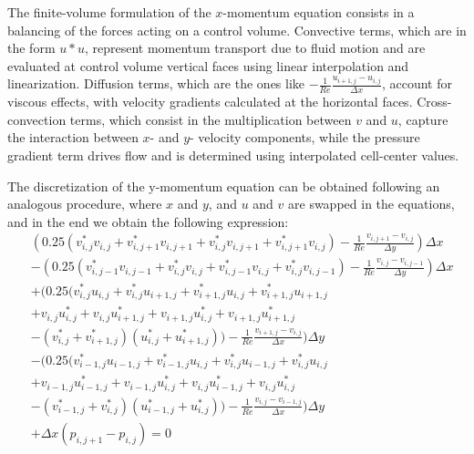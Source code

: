 \documentclass{article}
\begin{document}
The finite-volume formulation of the $x$-momentum equation consists in a balancing of the forces acting on a control volume.
Convective terms, which are in the form $u*u$, represent momentum transport due to fluid motion and are evaluated at control volume vertical faces using linear interpolation and linearization.
Diffusion terms, which are the ones like $-\frac{1}{Re} \frac{u_{i+1,j} - u_{i,j}}{\Delta x}$, account for viscous effects, with velocity gradients calculated at the horizontal faces.
Cross-convection terms, which consist in the multiplication between $v$ and $u$, capture the interaction between $x$- and $y$- velocity components, while the pressure gradient term drives flow and is determined using interpolated cell-center values.

The discretization of the y-momentum equation can be obtained following an analogous procedure, where $x$ and $y$, and $u$ and $v$ are swapped in the equations, and in the end we obtain the following expression:
\begin{equation}
  \begin{aligned}
    & (0.25 (v^*_{i,j} v_{i,j} + v^*_{i,j+1} v_{i,j+1} + v^*_{i,j} v_{i,j+1} + v^*_{i,j+1} v_{i,j}) - \frac{1}{Re} \frac{v_{i,j+1} - v_{i,j}}{\Delta y}) \Delta x  \\
    & - (0.25 (v^*_{i,j-1} v_{i,j-1} + v^*_{i,j} v_{i,j} + v^*_{i,j-1} v_{i,j} + v^*_{i,j} v_{i,j-1}) - \frac{1}{Re} \frac{v_{i,j} - v_{i,j-1}}{\Delta y}) \Delta x \\
    & + (0.25 (v^*_{i,j}u_{i,j} + v^*_{i,j}u_{i+1,j} + v^*_{i+1,j}u_{i,j} + v^*_{i+1,j}u_{i+1,j} \\
    & + v_{i,j}u^*_{i,j} + v_{i,j}u^*_{i+1,j} + v_{i+1,j}u^*_{i,j} + v_{i+1,j}u^*_{i+1,j} \\
    & - (v^*_{i,j} + v^*_{i+1,j}) (u^*_{i,j} + u^*_{i+1,j})) - \frac{1}{Re} \frac{v_{i+1,j} - v_{i,j}}{\Delta x}) \Delta y \\
    & - (0.25 (v^*_{i-1,j}u_{i-1,j} + v^*_{i-1,j}u_{i,j} + v^*_{i,j}u_{i-1,j} + v^*_{i,j}u_{i,j} \\
    & + v_{i-1,j}u^*_{i-1,j} + v_{i-1,j}u^*_{i,j} + v_{i,j}u^*_{i-1,j} + v_{i,j}u^*_{i,j} \\
    & - (v^*_{i-1,j} + v^*_{i,j}) (u^*_{i-1,j} + u^*_{i,j})) - \frac{1}{Re} \frac{v_{i,j} - v_{i-1,j}}{\Delta x}) \Delta y \\
    & + \Delta x (p_{i,j+1} - p_{i,j}) = 0
  \end{aligned}
\end{equation}
\end{document}
